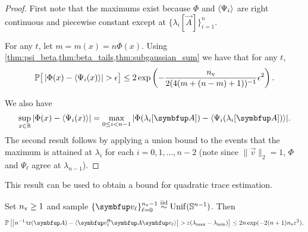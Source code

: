 \begin{proof}
First note that the maximums exist because \( \Phi\) and \( \langle \Psi_i \rangle \) are right continuous and piecewise constant except at \( \{ \lambda_i[\vec{A}] \}_{i=1}^{n} \).

For any \( t \), let \( m  = m(x) = n \Phi(x) \).
Using \cref{thm:psi_beta,thm:beta_tails,thm:subgaussian_sum} we have that for any \( t \),
\begin{align*}
    \mathbb{P}\big[ \left| \Phi(x) - \langle  \Psi_i(x)  \rangle \right| > \epsilon \big]
    \leq 2 \exp \left( - \frac{n_{\textup{v}}}{2 (4(m + (n-m)+1) )^{-1}} \epsilon^2 \right).
\end{align*}

We also have
\begin{align*}
    \sup_{x\in\R} |\Phi(x) - \samp{\Psi_i(x)}|
    = \max_{0\leq i<n-1} | \Phi(\lambda_i[\vec{A}]) - \samp{\Psi_i(\lambda_i[\vec{A}])} |.
\end{align*}
    The second result follows by applying a union bound to the events that the maximum is attained at \( \lambda_i \) for each \( i=0,1,\ldots, n-2 \) (note since \( \|\vec{v}\|_2=1 \), \( \Phi \) and \( \Psi_{\ell} \) agree at \( \lambda_{n-1} \)).
\end{proof}

This result can be used to obtain a bound for quadratic trace estimation.
\begin{theorem}
    \label{thm:unif_QTE}
    Set \( n_{\textup{v}} \geq 1 \) and sample \( \{ \vec{v}_{\ell} \}_{\ell=0}^{\nv-1} \stackrel{\textup{iid}}{\sim} \operatorname{Unif}(\mathbb{S}^{n-1}) \).
    Then
    \begin{equation*}
        \PP\left[ \left| n^{-1} \tr(\vec{A}) - \samp{ \vec{v}_{\ell}^\cT \vec{A} \vec{v}_\ell } \right| > \varepsilon (\lmax - \lmin)  \right]
        \leq 2 n \exp (- 2( n+1 ) \nv \varepsilon^2 ).
    \end{equation*}
\end{theorem}

